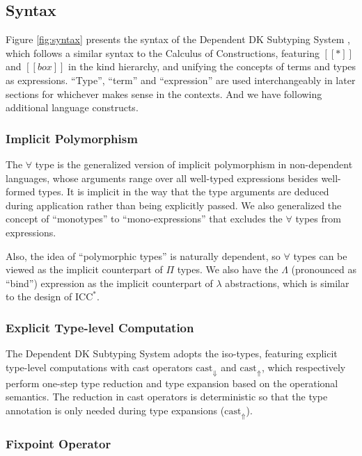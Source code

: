 \documentclass{llncs}
\newcommand{\castup}[0]{\mathrm{cast}_\Uparrow}
\newcommand{\castdn}[0]{\mathrm{cast}_\Downarrow}
\newcommand{\system}[0]{the Dependent DK Subtyping System }
\newcommand{\System}[0]{The Dependent DK Subtyping System }
\begin{document}
\subsection{Syntax}

Figure \ref{fig:syntax} presents the syntax of \system, which follows a similar
syntax to the Calculus of Constructions\cite{CoquandThierry1988Tcoc}, featuring
$[[*]]$ and $[[box]]$ in the kind hierarchy, and unifying the concepts of terms
and types as expressions. ``Type'', ``term'' and ``expression'' are used
interchangeably in later sections for whichever makes sense in the contexts.
And we have following additional language constructs.

\subsubsection{Implicit Polymorphism}

The $\forall$ type is the generalized version of implicit polymorphism in
non-dependent languages, whose arguments range over all well-typed expressions
besides well-formed types. It is implicit in the way that the type arguments are
deduced during application rather than being explicitly passed.
We also generalized the concept of ``monotypes'' to
``mono-expressions'' that excludes the $\forall$ types from expressions.

Also, the idea of ``polymorphic types'' is naturally dependent, so $\forall$
types can be viewed as the implicit counterpart of $\Pi$ types. We also have
the $\Lambda$ (pronounced as ``bind'') expression as the implicit counterpart of
$\lambda$ abstractions, which is similar to the design of $\text{ICC}^*$\cite{barras2008implicit}.

\subsubsection{Explicit Type-level Computation}
\label{sec:cast}

\System adopts the iso-types\cite{yang2016unified}, featuring explicit type-level
computations with cast operators $\castdn$ and $\castup$, which respectively perform one-step
type reduction and type expansion based on the operational semantics.
The reduction in cast operators is deterministic so that the type annotation is
only needed during type expansions ($\castup$).

\subsubsection{Fixpoint Operator}
\end{document}
